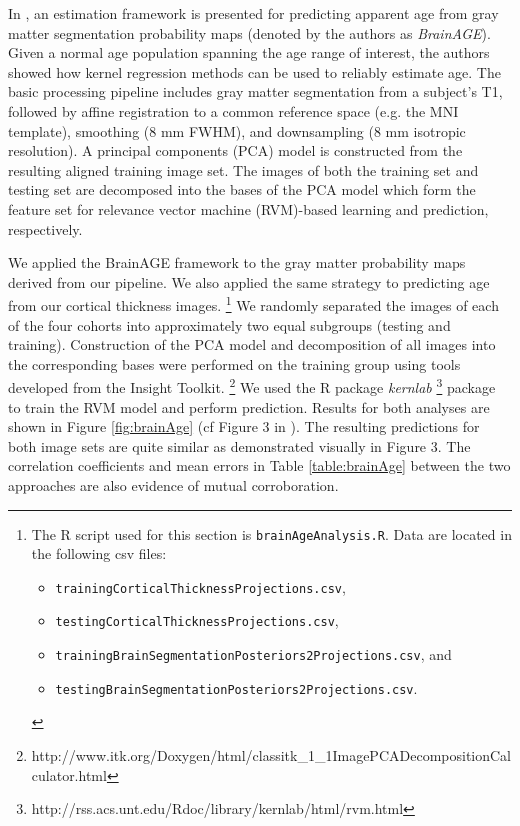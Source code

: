 In \cite{franke2010}, an estimation framework is presented for predicting 
apparent age from gray matter segmentation probability maps (denoted by the authors as {\it BrainAGE}).  
Given a normal age population spanning the age range of interest, the authors showed
how kernel regression methods can be used to reliably estimate age.  The basic processing pipeline includes gray matter segmentation
from a subject's T1, followed by affine registration to a common reference space (e.g.
the MNI template), smoothing (8 mm FWHM), and downsampling (8 mm 
isotropic resolution).  A principal components (PCA) model is constructed 
from the resulting aligned training image set.  The images of both the training set and 
testing set are decomposed into the bases of the PCA model which form the feature
set for relevance vector machine (RVM)-based learning and prediction, respectively. 

We applied the BrainAGE framework to the gray matter probability maps derived
from our pipeline.  We also applied the same strategy to predicting age from 
our cortical thickness images.%
\footnote{
The R script used for this section is {\tt brainAgeAnalysis.R}.  Data are
located in the following csv files: 
\begin{itemize}
\item {\tt trainingCorticalThicknessProjections.csv}, 
\item {\tt testingCorticalThicknessProjections.csv},
\item {\tt trainingBrainSegmentationPosteriors2Projections.csv}, and
\item {\tt testingBrainSegmentationPosteriors2Projections.csv}.
\end{itemize}
}  
We randomly separated the images of each of the 
four cohorts into approximately two equal subgroups (testing and training).
Construction of the PCA model and decomposition of all images into the corresponding 
bases were performed on the training group using tools developed from the Insight Toolkit.%
\footnote{
http://www.itk.org/Doxygen/html/classitk\_1\_1ImagePCADecompositionCalculator.html  
}
We used the R package {\it kernlab}%
\footnote{
http://rss.acs.unt.edu/Rdoc/library/kernlab/html/rvm.html
} 
package to train the RVM model and perform prediction.  Results for both
analyses  are shown in Figure \ref{fig:brainAge} (cf Figure 3 in \cite{franke2010}).
The resulting predictions for both image sets are quite similar as demonstrated 
visually in Figure 3.  The correlation coefficients and mean errors in Table 
\ref{table:brainAge} between the
two approaches are also evidence of mutual corroboration.


